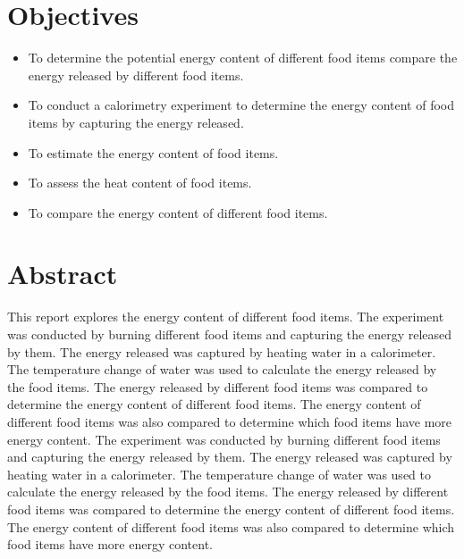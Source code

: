 \documentclass[a4paper, 12pt, english]{article}
\begin{document}


\newpage
\section{Objectives}
\begin{itemize}
	\item To determine the potential energy content of different food items compare the
	      energy released by different food items.
	\item To conduct a calorimetry experiment to determine the energy content of food
	      items by capturing the energy released.
	\item To estimate the energy content of food items.
	\item To assess the heat content of food items.
	\item To compare the energy content of different food items.
\end{itemize}

\section{Abstract}
This report explores the energy content of different food items. The experiment
was conducted by burning different food items and capturing the energy released
by them. The energy released was captured by heating water in a calorimeter.
The temperature change of water was used to calculate the energy released by
the food items. The energy released by different food items was compared to
determine the energy content of different food items. The energy content of
different food items was also compared to determine which food items have more
energy content. The experiment was conducted by burning different food items
and capturing the energy released by them. The energy released was captured by
heating water in a calorimeter. The temperature change of water was used to
calculate the energy released by the food items. The energy released by
different food items was compared to determine the energy content of different
food items. The energy content of different food items was also compared to
determine which food items have more energy content.
\end{document}
